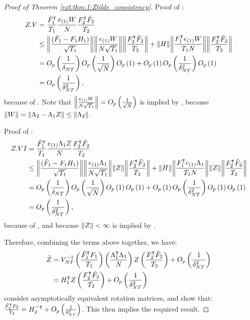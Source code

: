 \documentclass[12pt]{article}
\newcommand*{\tran}{\intercal}
\theoremstyle{plain}
\numberwithin{equation}{section}
\begin{document}
\begin{proof}[Proof of Theorem \ref{ext:thm:1:Ztilde_consistency}]
Proof of :
\begin{align*}
Z.V
&= 
\frac{\tilde{F}_1^\tran}{T_1} 
\frac{e_{(1)} W}{N} 
\frac{F_2^\tran \tilde{F}_2}{T_2} \\
&\leq 
\norm{\frac{(\tilde{F}_1 - F_1 H_1)}{\sqrt{T_1}}}
\norm{\frac{e_{(1)} W}{N \sqrt{T_1}} }
\norm{\frac{F_2^\tran \tilde{F}_2}{T_2}} +
\norm{H}
\norm{\frac{F_1^\tran e_{(1)} W}{T_1 N}}
\norm{\frac{F_2^\tran \tilde{F}_2}{T_2}} \\
&= \Opdelta \OprtN \Op{1} + \Op{1} \Opdeltasq \Op{1} \\
&= \Opdeltasq,
\end{align*}
because of . Note that $\norm{\frac{e_{(1)} W}{N \sqrt{T_1}}} = O_p\left( \frac{1}{\sqrt{N}}\right)$ is implied by , because $\norm{W} = \norm{\Lambda_2 - \Lambda_1 Z} \leq \norm{\Lambda_2}$.

Proof of :
\begin{align*}
Z.VI
&= 
\frac{\tilde{F}_1^\tran}{T_1} 
\frac{e_{(1)} \Lambda_1 Z}{N} 
\frac{F_2^\tran \tilde{F}_2}{T_2} \\
&\leq 
\norm{\frac{(\tilde{F}_1 - F_1 H_1)}{\sqrt{T_1}}}
\norm{\frac{e_{(1)} \Lambda_1}{N \sqrt{T_1}} }
\norm{Z}
\norm{\frac{F_2^\tran \tilde{F}_2}{T_2}} +
\norm{H}
\norm{\frac{F_1^\tran e_{(1)} \Lambda_1}{T_1 N}}
\norm{Z} 
\norm{\frac{F_2^\tran \tilde{F}_2}{T_2}} \\
&= \Opdelta \OprtN \Op{1} \Op{1} + \Op{1} \Opdeltasq \Op{1} \Op{1} \\
&= \Opdeltasq,
\end{align*}
because of , and because $\norm{Z} < \infty$ is implied by .

Therefore, combining the terms above together, we have:
\begin{align*}
\tilde{Z} &= 
V_{NT}^{-1} \left( \frac{\tilde{F}_1^\tran F_1}{T_1} \right) 
\left( \frac{\Lambda_1^\tran \Lambda_1}{N} \right) Z
\left( \frac{F_2^\tran \tilde{F}_2}{T_2} \right) + 
\Opdeltasq \\
&= H_1^\tran Z
\left( \frac{F_2^\tran \tilde{F}_2}{T_2} \right) + 
\Opdeltasq
\end{align*}
\textcite{bai_simpler_2020} consider asymptotically equivalent rotation matrices, and show that:
$\frac{\tilde{F}_2^\tran F_2}{T_2} = H_2^{-\tran} + \Opdeltasq$. This 
then implies the required result.
\end{proof}
\end{document}
